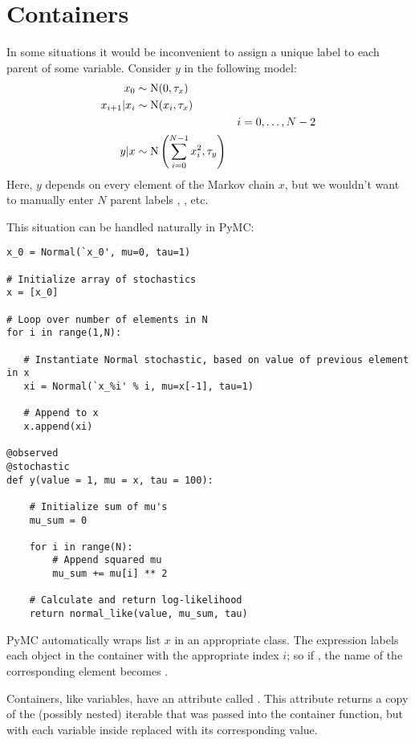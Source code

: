 \hypertarget{container}{}
\section{Containers} \label{container}

In some situations it would be inconvenient to assign a unique label to each parent of some variable. Consider $y$ in the following model:
\begin{align*}
    x_0 &\sim \textup N (0,\tau_x)\\
    x_{i+1}|x_i &\sim \textup{N}(x_i, \tau_x)\\
    &&i=0,\ldots, N-2\\
    y|x &\sim \textup N \left(\sum_{i=0}^{N-1}x_i^2,\tau_y\right)
\end{align*}
Here, $y$ depends on every element of the Markov chain $x$, but we wouldn't want to manually enter $N$ parent labels , , etc.

This situation can be handled naturally in PyMC:
\begin{verbatim}
x_0 = Normal(`x_0', mu=0, tau=1)

# Initialize array of stochastics
x = [x_0]

# Loop over number of elements in N
for i in range(1,N):  
      
   # Instantiate Normal stochastic, based on value of previous element in x
   xi = Normal(`x_%i' % i, mu=x[-1], tau=1)    
 
   # Append to x
   x.append(xi)

@observed
@stochastic
def y(value = 1, mu = x, tau = 100):

    # Initialize sum of mu's
    mu_sum = 0

    for i in range(N):
        # Append squared mu
        mu_sum += mu[i] ** 2

    # Calculate and return log-likelihood
    return normal_like(value, mu_sum, tau)
\end{verbatim}
PyMC automatically wraps list $x$ in an appropriate  class. The  expression  labels each  object in the container with the appropriate index $i$; so if , the name of the corresponding element becomes .

Containers, like variables, have an attribute called . This attribute returns a copy of the (possibly nested) iterable that was passed into the container function, but with each variable inside replaced with its corresponding value. 

